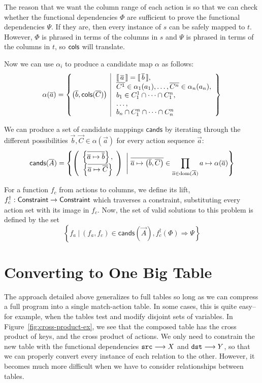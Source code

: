 The reason that we want the column range of each action is so that we
can check whether the functional dependencies $\Phi$ are sufficient to
prove the functional dependencies $\Psi$. If they are, then every
instance of $s$ can be safely mapped to $t$. However, $\Phi$ is
phrased in terms of the columns in $s$ and $\Psi$ is phrased in terms
of the columns in $t$, so $\mathsf{cols}$ will translate.

Now we can use $\alpha_i$ to produce a candidate map $\alpha $ as
follows:
\[\alpha(\vec{a}) = \left\{
    \left(\vec b, \cols(\vec C)\right)~
    \begin{array}{|>{\;}l}
      \bracbb{\vec a} = \bracbb{\vec b},\\
      \vec {C^1} \in \alpha_1(a_1), \ldots, \vec{C^n} \in \alpha_n(a_n),\\
      b_1 \in C^1_1 \cap \cdots \cap C^n_1, \\
      \ldots,  \\
      b_n \cap C^n_1 \cap \cdots \cap C^n_n \\
    \end{array}\right\}\]


We can produce a set of candidate mappings $\textsf{cands}$ by
iterating through the different possibilities
$\vec b,\vec C \in \alpha(\vec a)$ for every action sequence $\vec a$:
\[\textsf{cands}(\overline{A}) =
  \left\{
    \left(\begin{array}{r}
      \left\{\overline{\overline{a} \mapsto \overline{b}}\right\}, \\
      \left\{\overline{\overline{a} \mapsto \overline{C}}\right\}
    \end{array}\right)~\Bigg{|}~\overline{\overline{a} \mapsto \left(\overline{b}, \overline{C}\right)}
    \in \prod_{\overline{a} \in \mathrm{dom}(\overline{A})} a \mapsto \alpha(\overline{a})\right\}\]


For a function $f_c$ from actions to columns, we define its lift,
$f_c^\dagger : \mathsf{Constraint} \to \mathsf{Constraint}$ which traverses a
constraint, substituting every action set with its image in $f_c$.
Now, the set of valid solutions to this problem is defined by the set
\[\left\{ f_a~\big|~(f_a,f_c) \in \textsf{cands}(\vec A),
  f_c^\dagger(\Phi) \Rightarrow \Psi \right\}\]




\section{Converting to One Big Table}

The approach detailed above generalizes to full tables so long as we
can compress a full program into a single match-action table. In some
cases, this is quite easy--for example, when the tables test and
modify disjoint sets of variables. In Figure~\ref{fig:cross-product-ex},
we see that the composed table has the cross product of keys, and the
cross product of actions. We only need to constrain the new table with
the functional dependencies $\texttt{src} \longrightarrow X$ and
$\texttt{dst} \longrightarrow Y$, so that we can properly convert
every instance of each relation to the other. However, it becomes much
more difficult when we have to consider relationships between tables.

